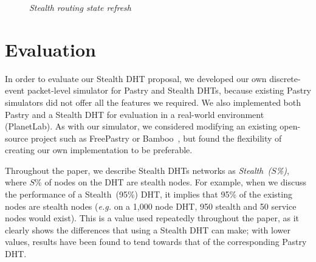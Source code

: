 \documentclass[letterpaper]{sig-alternate} %
\begin{document}
\begin{figure}[tb]\centering
{}
\caption{\em Stealth routing state refresh}
\label{fig:route_refresh}
\end{figure}

\section{Evaluation}
\label{sect-eval}

In order to evaluate our Stealth DHT proposal, we developed our own
discrete-event packet-level simulator for Pastry and Stealth DHTs, because
existing Pastry simulators did not offer all the features we required. We also
implemented both Pastry and a Stealth DHT for evaluation in a real-world
environment (PlanetLab). As with our simulator, we considered modifying an
existing open-source project such as FreePastry or
Bamboo~\cite{freepastry,churn1}, but found the flexibility of creating our own
implementation to be preferable.

Throughout the paper, we describe Stealth DHTs networks as
\emph{Stealth~($S$\%)}, where $S$\% of nodes on the DHT are stealth
nodes. For example, when we discuss the performance of a Stealth~(95\%)
DHT, it implies that 95\% of the existing nodes are stealth nodes
(\emph{e.g.} on a 1,000 node DHT, 950 stealth and 50 service nodes
would exist). This is a value used repeatedly throughout the paper, as
it clearly shows the differences that using a Stealth DHT can make;
with lower values, results have been found to tend towards that of the
corresponding Pastry DHT.
\end{document}
